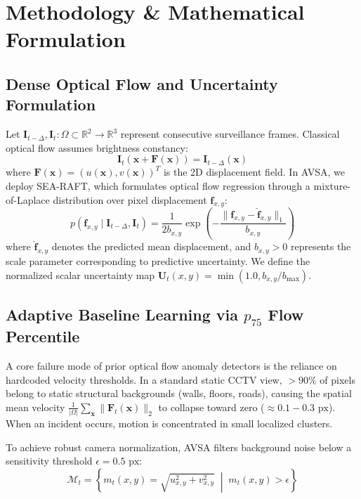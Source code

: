 \documentclass[conference]{IEEEtran}
\begin{document}
\section{Methodology \& Mathematical Formulation}

\subsection{Dense Optical Flow and Uncertainty Formulation}
Let $\mathbf{I}_{t-\Delta}, \mathbf{I}_t: \Omega \subset \mathbb{R}^2 \to \mathbb{R}^3$ represent consecutive surveillance frames. Classical optical flow assumes brightness constancy:
\begin{equation}
\mathbf{I}_t(\mathbf{x} + \mathbf{F}(\mathbf{x})) = \mathbf{I}_{t-\Delta}(\mathbf{x})
\end{equation}
where $\mathbf{F}(\mathbf{x}) = (u(\mathbf{x}), v(\mathbf{x}))^T$ is the 2D displacement field. In AVSA, we deploy SEA-RAFT, which formulates optical flow regression through a mixture-of-Laplace distribution over pixel displacement $\mathbf{f}_{x,y}$:
\begin{equation}
p(\mathbf{f}_{x,y} \mid \mathbf{I}_{t-\Delta}, \mathbf{I}_t) = \frac{1}{2 b_{x,y}} \exp\left(-\frac{\|\mathbf{f}_{x,y} - \hat{\mathbf{f}}_{x,y}\|_1}{b_{x,y}}\right)
\end{equation}
where $\hat{\mathbf{f}}_{x,y}$ denotes the predicted mean displacement, and $b_{x,y} > 0$ represents the scale parameter corresponding to predictive uncertainty. We define the normalized scalar uncertainty map $\mathbf{U}_t(x, y) = \min(1.0, b_{x,y} / b_{\max})$.

\subsection{Adaptive Baseline Learning via $p_{75}$ Flow Percentile}
A core failure mode of prior optical flow anomaly detectors is the reliance on hardcoded velocity thresholds. In a standard static CCTV view, $>90\%$ of pixels belong to static structural backgrounds (walls, floors, roads), causing the spatial mean velocity $\frac{1}{|\Omega|} \sum_{\mathbf{x}} \|\mathbf{F}_t(\mathbf{x})\|_2$ to collapse toward zero ($\approx 0.1-0.3\text{ px}$). When an incident occurs, motion is concentrated in small localized clusters.

To achieve robust camera normalization, AVSA filters background noise below a sensitivity threshold $\epsilon = 0.5\text{ px}$:
\begin{equation}
\mathcal{M}_t = \left\{ m_t(x, y) = \sqrt{u_{x,y}^2 + v_{x,y}^2} \;\middle|\; m_t(x, y) > \epsilon \right\}
\end{equation}
\end{document}
